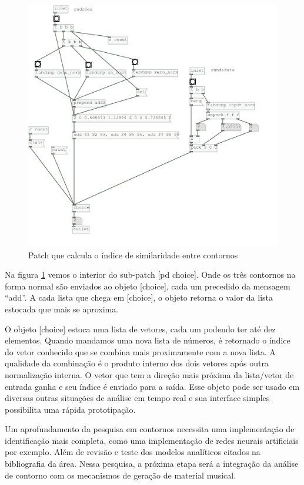 \documentclass{ppgmus}
\begin{document}
\begin{figure}
\includegraphics[scale=.5]{similaridade-algo}
\caption{Patch que calcula o índice de similaridade entre contornos}
\label{similaridade-algo}
\end{figure}


Na figura \ref{similaridade-algo} vemos o interior do sub-patch [pd choice].
Onde os três contornos na forma normal são enviados ao objeto [choice], cada um
precedido da mensagem ``add''. A cada lista que chega em [choice], o objeto retorna
o valor da lista estocada que mais se aproxima.

O objeto [choice] estoca uma lista de vetores, cada um podendo ter até dez
elementos. Quando mandamos uma nova lista de números, é retornado o índice
do vetor conhecido que se combina mais proximamente com a nova lista. A qualidade
da combinação  é o produto interno dos dois vetores após outra normalização
interna. O vetor que tem a direção mais próxima da lista/vetor de entrada ganha e seu
índice é enviado para a saída. Esse objeto pode ser usado em diversas outras situações
de análise em tempo-real e sua interface simples possibilita uma rápida prototipação.

Um aprofundamento da pesquisa em contornos necessita uma implementação de identificação
mais completa, como uma implementação de redes neurais artificiais por exemplo. Além
de revisão e teste dos modelos analíticos citados na bibliografia da área.
Nessa pesquisa, a próxima etapa será a integração da análise de contorno com os
mecanismos de geração de material musical.
\end{document}

